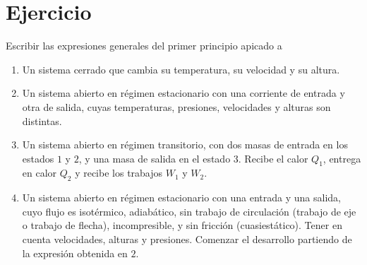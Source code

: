 \section{Ejercicio}\label{ej:Chap04Ejercicio01}

Escribir las expresiones generales del primer principio apicado a
\begin{enumerate}
    \item Un sistema cerrado que cambia su temperatura, su velocidad y su altura.
    \item Un sistema abierto en régimen estacionario con una corriente de entrada y otra de salida, cuyas temperaturas, presiones, velocidades y alturas son distintas.
    \item Un sistema abierto en régimen transitorio, con dos masas de entrada en los estados $1$ y $2$, y una masa de salida en el estado $3$. Recibe el calor $Q_1$, entrega en calor $Q_2$ y recibe los trabajos $W_1$ y $W_2$.
    \item Un sistema abierto en régimen estacionario con una entrada y una salida, cuyo flujo es isotérmico, adiabático, sin trabajo de circulación (trabajo de eje o trabajo de flecha), incompresible, y sin fricción (cuasiestático). Tener en cuenta velocidades, alturas y presiones. Comenzar el desarrollo partiendo de la expresión obtenida en $2$.
\end{enumerate}